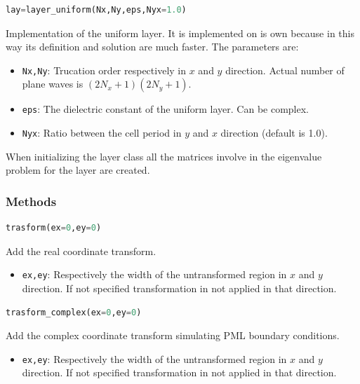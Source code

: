 \documentclass[a4paper,10pt]{report}
\begin{document}
\begin{lstlisting}[language=Python]
lay=layer_uniform(Nx,Ny,eps,Nyx=1.0)
\end{lstlisting}
Implementation of the uniform layer. It is implemented on is own because in this way its definition and solution are much faster. The parameters are:
\begin{itemize}[noitemsep,topsep=0pt,parsep=0pt,partopsep=0pt]
\item \texttt{Nx,Ny}: Trucation order respectively in $x$ and $y$ direction. Actual number of plane waves is $(2N_x+1)(2N_y+1)$.
\item \texttt{eps}: The dielectric constant of the uniform layer. Can be complex. 
\item \texttt{Nyx}: Ratio between the cell period in $y$ and $x$ direction (default is 1.0).
\end{itemize}
 


When initializing the layer class all the matrices involve in the eigenvalue problem for the layer are created.
\subsubsection{Methods}
\begin{lstlisting}[language=Python,basicstyle=\ttfamily\Large]
trasform(ex=0,ey=0)
\end{lstlisting}
Add the real coordinate transform.
\begin{itemize}[noitemsep,topsep=0pt,parsep=0pt,partopsep=0pt]
\item \texttt{ex,ey}: Respectively the width of the untransformed region in $x$ and $y$ direction. If not specified transformation in not applied in that direction.
\end{itemize}

\begin{lstlisting}[language=Python,basicstyle=\ttfamily\Large]
trasform_complex(ex=0,ey=0)
\end{lstlisting}
Add the complex coordinate transform simulating PML boundary conditions. 
\begin{itemize}[noitemsep,topsep=0pt,parsep=0pt,partopsep=0pt]
\item \texttt{ex,ey}: Respectively the width of the untransformed region in $x$ and $y$ direction. If not specified transformation in not applied in that direction.
\end{itemize}
\end{document}
